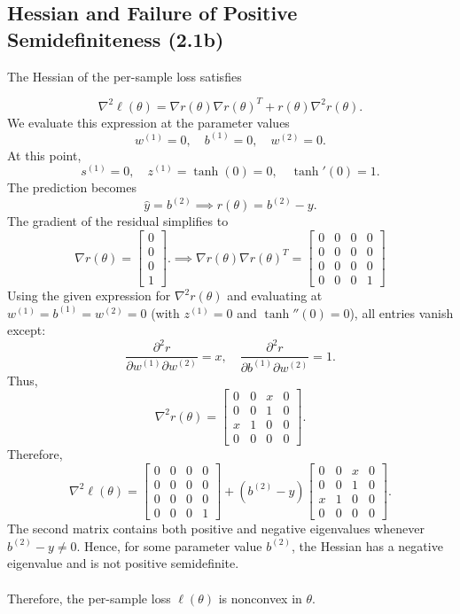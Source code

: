 \documentclass[11pt]{article}
\begin{document}
\subsection*{Hessian and Failure of Positive Semidefiniteness (2.1b)}
The Hessian of the per-sample loss satisfies

\[
\nabla^2 \ell(\theta)
=
\nabla r(\theta)\nabla r(\theta)^T
+
r(\theta)\nabla^2 r(\theta).
\]
We evaluate this expression at the parameter values
\[
w^{(1)} = 0,
\quad
b^{(1)} = 0,
\quad
w^{(2)} = 0.
\]
At this point,
\[
s^{(1)} = 0,
\quad
z^{(1)} = \tanh(0)=0,
\quad
\tanh'(0)=1.
\]
The prediction becomes
\[
\hat{y} = b^{(2)} \implies r(\theta) = b^{(2)} - y.
\]
The gradient of the residual simplifies to
\[
\nabla r(\theta)
=
\begin{bmatrix}
0 \\
0 \\
0 \\
1
\end{bmatrix}. \implies \nabla r(\theta)\nabla r(\theta)^T
=
\begin{bmatrix}
0&0&0&0\\
0&0&0&0\\
0&0&0&0\\
0&0&0&1
\end{bmatrix}
\]
Using the given expression for $\nabla^2 r(\theta)$ and evaluating at $w^{(1)}=b^{(1)}=w^{(2)}=0$ (with $z^{(1)}=0$ and $\tanh''(0)=0$), all entries vanish except:
\[
\frac{\partial^2 r}{\partial w^{(1)} \partial w^{(2)}} = x,
\quad
\frac{\partial^2 r}{\partial b^{(1)} \partial w^{(2)}} = 1.
\]
Thus,
\[
\nabla^2 r(\theta)
=
\begin{bmatrix}
0&0&x&0\\
0&0&1&0\\
x&1&0&0\\
0&0&0&0
\end{bmatrix}.
\]
Therefore,
\[
\nabla^2 \ell(\theta)
=
\begin{bmatrix}
0&0&0&0\\
0&0&0&0\\
0&0&0&0\\
0&0&0&1
\end{bmatrix}
+
(b^{(2)}-y)
\begin{bmatrix}
0&0&x&0\\
0&0&1&0\\
x&1&0&0\\
0&0&0&0
\end{bmatrix}.
\]
The second matrix contains both positive and negative eigenvalues whenever $b^{(2)}-y \neq 0$. Hence, for some parameter value $b^{(2)}$, the Hessian has a negative eigenvalue and is not positive semidefinite.
\\
\\
Therefore, the per-sample loss $\ell(\theta)$ is nonconvex in $\theta$.
\end{document}
